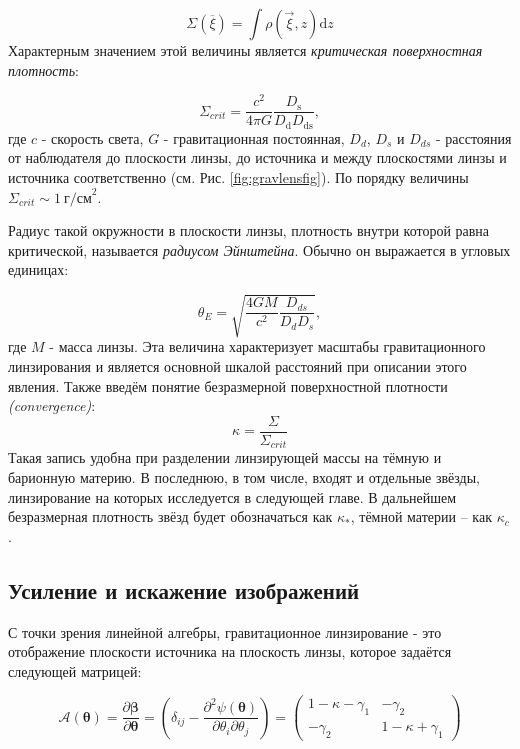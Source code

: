 \begin{equation}\label{sigmasurf}
\Sigma(\overline{\xi})=\int \rho(\vec{\xi}, z) \mathrm{d} z
\end{equation}
Характерным значением этой величины является \textit{критическая поверхностная плотность}:

\begin{equation}\label{sigmacrit}
\Sigma_{crit}=\frac{c^{2}}{4 \pi G} \frac{D_{\mathrm{s}}}{D_{\mathrm{d}} D_{\mathrm{ds}}},
\end{equation}
где $c$ - скорость света, $G$ - гравитационная постоянная, $D_d$, $D_s$ и $D_{ds}$ - расстояния от наблюдателя до плоскости линзы, до источника и между плоскостями линзы и источника соответственно (см. Рис. \ref{fig:gravlensfig}). По порядку величины $\Sigma_{crit} \sim 1 \ \textrm{г/см}^2$.

Радиус такой окружности в плоскости линзы, плотность внутри которой равна критической, называется \textit{радиусом Эйнштейна}. Обычно он выражается в угловых единицах: 

\begin{equation}\label{r_ein}
\theta_{E}=\sqrt{\frac{4 G M}{c^{2}} \frac{D_{d s}}{D_{d} D_{s}}},
\end{equation}
где $M$ - масса линзы. Эта величина характеризует масштабы гравитационного линзирования и является основной шкалой расстояний при описании этого явления. Также введём понятие безразмерной поверхностной плотности \textit{(convergence)}:
\begin{equation}\label{convergence}
\kappa = \frac{\Sigma}{\Sigma_{crit}}
\end{equation}
Такая запись удобна при разделении линзирующей массы на тёмную и барионную материю. В последнюю, в том числе, входят и отдельные звёзды, линзирование на которых исследуется в следующей главе. В дальнейшем безразмерная плотность звёзд будет обозначаться как $\kappa_*$, тёмной материи -- как $\kappa_c$.

\subsection{Усиление и искажение изображений}

С точки зрения линейной алгебры, гравитационное линзирование - это отображение плоскости источника на плоскость линзы, которое задаётся следующей матрицей:

\begin{equation}
\mathcal{A}(\boldsymbol{\theta})=\frac{\partial \boldsymbol{\beta}}{\partial \boldsymbol{\theta}}=\left(\delta_{i j}-\frac{\partial^{2} \psi(\boldsymbol{\theta})}{\partial \theta_{i} \partial \theta_{j}}\right)=\left(\begin{array}{cc}{1-\kappa-\gamma_{1}} & {-\gamma_{2}} \\ {-\gamma_{2}} & {1-\kappa+\gamma_{1}}\end{array}\right)
\end{equation}

